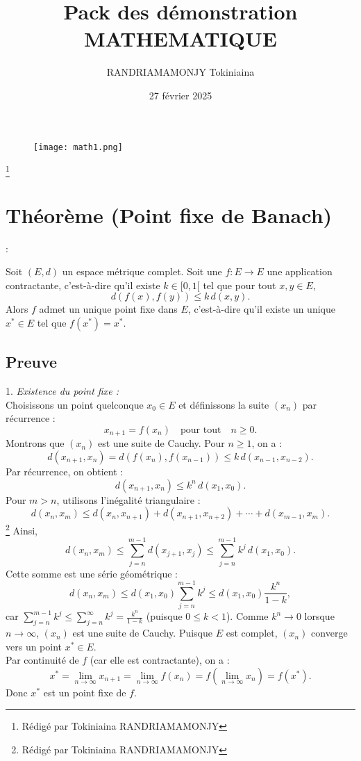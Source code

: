 \documentclass[12pt]{book}
\begin{document}
 

	\thispagestyle{empty} 
	\begin{figure}
		 \vspace*{\fill }
  \begin{center} 
	{	
		 \texttt{[image: math1.png]}\par
	} 
\end{center}
	 \vspace*{\fill }
 
 \end{figure}
\clearpage

 
 \title{Pack des démonstration MATHEMATIQUE}
 \author{RANDRIAMAMONJY Tokiniaina}
 \date{27 février 2025}
 \tableofcontents
 \clearpage
 \footnote{R\'edig\'e par Tokiniaina RANDRIAMAMONJY}
\section {Théorème (Point fixe de Banach)} :

Soit $(E, d)$ un espace métrique complet.
Soit une $f : E \to E$ une application contractante, c'est-à-dire qu'il existe $k \in [0, 1[$ tel que pour tout $x, y \in E$,
\[
d(f(x), f(y)) \leq k \, d(x, y).
\]
Alors $f$ admet un unique point fixe dans $E$, c'est-à-dire qu'il existe un unique $x^* \in E$ tel que $f(x^*) = x^*$.
\par 
\vspace{1cm}
\subsection*{Preuve}
\vspace{0.5cm}

1. \textit{Existence du point fixe :} \\
Choisissons un point quelconque $x_0 \in E$ et définissons la suite $(x_n)$ par récurrence : 
\[
x_{n+1} = f(x_n) \quad \text{pour tout} \quad n \geq 0.
\]
Montrons que $(x_n)$ est une suite de Cauchy. Pour $n \geq 1$, on a :
\[
d(x_{n+1}, x_n) = d(f(x_n), f(x_{n-1})) \leq k \, d(x_{n-1}, x_{n-2}).
\]
Par récurrence, on obtient :
\[
d(x_{n+1}, x_n) \leq k^n \, d(x_1, x_0).
\]
Pour $m > n$, utilisons l'inégalité triangulaire :
\[
d(x_n, x_m) \leq d(x_n, x_{n+1}) + d(x_{n+1}, x_{n+2}) + \cdots + d(x_{m-1}, x_m).
\]
\clearpage
\footnote{R\'edig\'e par Tokiniaina RANDRIAMAMONJY} 
Ainsi,
\[
d(x_n, x_m) \leq \sum_{j=n}^{m-1} d(x_{j+1}, x_j) \leq \sum_{j=n}^{m-1} k^j \, d(x_1, x_0).
\]
Cette somme est une série géométrique :
\[
d(x_n, x_m) \leq d(x_1, x_0) \sum_{j=n}^{m-1} k^j \leq d(x_1, x_0) \frac{k^n}{1 - k},
\]
car $\sum_{j=n}^{m-1} k^j \leq \sum_{j=n}^{\infty} k^j = \frac{k^n}{1 - k}$ (puisque $0 \leq k < 1$). Comme $k^n \to 0$ lorsque $n \to \infty$, $(x_n)$ est une suite de Cauchy. Puisque $E$ est complet, $(x_n)$ converge vers un point $x^* \in E$. \\
Par continuité de $f$ (car elle est contractante), on a :
\[
x^* = \lim_{n \to \infty} x_{n+1} = \lim_{n \to \infty} f(x_n) = f\left(\lim_{n \to \infty} x_n\right) = f(x^*).
\]
Donc $x^*$ est un point fixe de $f$.
\end{document}
